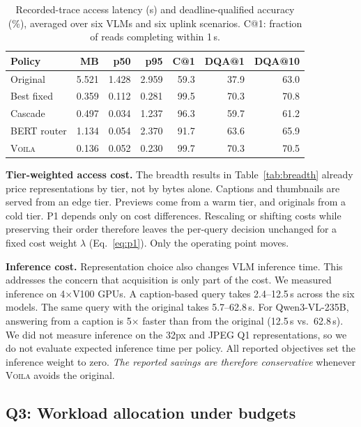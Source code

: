 \documentclass[10pt,conference]{IEEEtran}
\newcommand{\system}{\textsc{Voila}\xspace}
\newcommand{\tableformat}{\footnotesize\setlength{\tabcolsep}{3pt}\renewcommand{\arraystretch}{0.95}}
\newcommand{\mQThree}{Qwen3-VL-235B\xspace}
\begin{document}
\begin{table}[t]
\centering
\tableformat
\caption{Recorded-trace access latency (s) and deadline-qualified accuracy
(\%), averaged over six VLMs and six uplink scenarios. C@1: fraction of reads
completing within 1\,s.}
\label{tab:trace}
\begin{tabular}{lrrrrrr}
\toprule
Policy & MB & p50 & p95 & C@1 & DQA@1 & DQA@10 \\
\midrule
Original    & 5.521 & 1.428 & 2.959 & 59.3 & 37.9 & 63.0 \\
Best fixed  & 0.359 & 0.112 & 0.281 & 99.5 & 70.3 & 70.8 \\
Cascade     & 0.497 & 0.034 & 1.237 & 96.3 & 59.7 & 61.2 \\
BERT router & 1.134 & 0.054 & 2.370 & 91.7 & 63.6 & 65.9 \\
\system     & 0.136 & 0.052 & 0.230 & 99.7 & 70.3 & 70.5 \\
\bottomrule
\end{tabular}
\end{table}

\textbf{Tier-weighted access cost.} The breadth results in
Table~\ref{tab:breadth} already price representations by tier, not by bytes
alone. Captions and thumbnails are served from an edge tier. Previews come
from a warm tier, and originals from a cold tier. P1 depends only on cost
differences. Rescaling or shifting costs while preserving their order
therefore leaves the per-query decision unchanged for a fixed cost weight
$\lambda$ (Eq.~\ref{eq:p1}). Only the operating point moves.

\textbf{Inference cost.} Representation choice also changes VLM inference time.
This addresses the concern that acquisition is only part of the cost. We
measured inference on 4$\times$V100 GPUs. A caption-based query takes
2.4--12.5\,s across the six models. The same query with the original takes
5.7--62.8\,s. For \mQThree, answering from a caption is 5$\times$ faster than
from the original (12.5\,s vs.\ 62.8\,s). %
We did not measure inference on the 32px and JPEG Q1 representations, so we do
not evaluate expected inference time per policy. All reported objectives set
the inference weight to zero. \emph{The reported savings are therefore
conservative} whenever \system avoids the original.

\subsection{Q3: Workload allocation under budgets}
\end{document}
